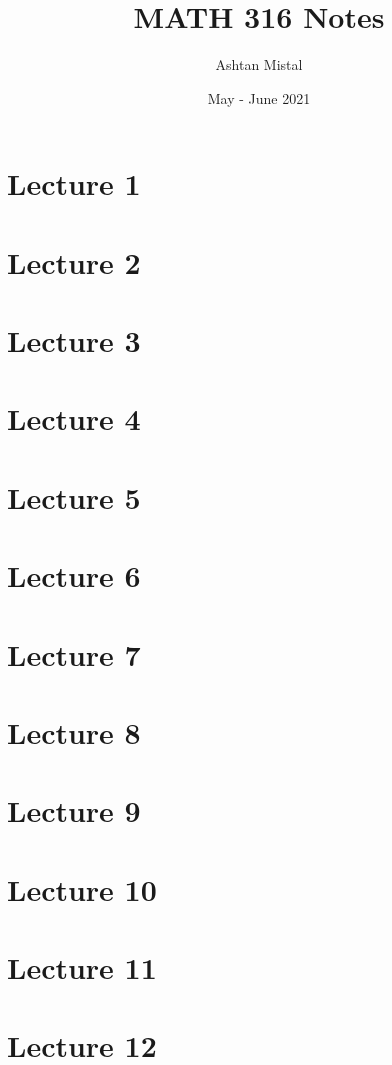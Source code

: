 \documentclass{report}
\title{MATH 316 Notes}
\author{Ashtan Mistal}
\date{May - June 2021}
\begin{document}
\maketitle

\tableofcontents{}

\chapter{Lecture 1}


\chapter{Lecture 2}


\chapter{Lecture 3}


\chapter{Lecture 4}


\chapter{Lecture 5}


\chapter{Lecture 6}


\chapter{Lecture 7}


\chapter{Lecture 8}


\chapter{Lecture 9}


\chapter{Lecture 10}


\chapter{Lecture 11}


\chapter{Lecture 12}

\end{document}
